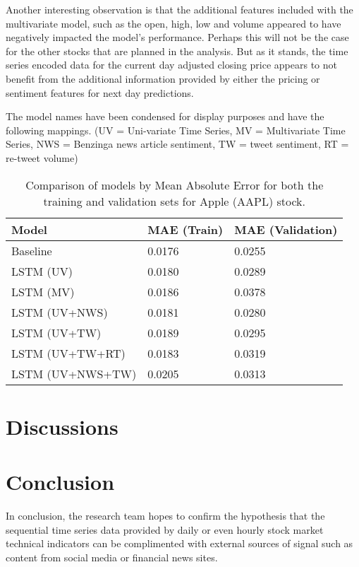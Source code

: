 \documentclass{llncs}
\begin{document}
Another interesting observation is that the additional features included with the multivariate model, such as the open, high, low and volume appeared to have negatively impacted the model's performance.  Perhaps this will not be the case for the other stocks that are planned in the analysis.  But as it stands, the time series encoded data for the current day adjusted closing price appears to not benefit from the additional information provided by either the pricing or sentiment features for next day predictions.

The model names have been condensed for display purposes and have the following mappings.  (UV = Uni-variate Time Series, MV = Multivariate Time Series, NWS = Benzinga news article sentiment, TW = tweet sentiment, RT = re-tweet volume) 

\begin{table}[ht!]
    \centering
    \caption{Comparison of models by Mean Absolute Error for both the training and validation sets for Apple (AAPL) stock.}
    \begin{tabu}{*{3}{X[c]}}
    \toprule
        Model & MAE (Train) & MAE (Validation) \\
    \midrule
    Baseline & 0.0176 & 0.0255 \\
    LSTM (UV) & 0.0180 & 0.0289 \\
    LSTM (MV) & 0.0186 & 0.0378 \\
    LSTM (UV+NWS) & 0.0181 & 0.0280 \\
    LSTM (UV+TW) & 0.0189 & 0.0295 \\
    LSTM (UV+TW+RT) & 0.0183 & 0.0319 \\
    LSTM (UV+NWS+TW) & 0.0205 & 0.0313 \\
 
    \bottomrule
    \end{tabu}
 \label{tab:model_comparisons}
\end{table}


\section{Discussions}

\section{Conclusion}


In conclusion, the research team hopes to confirm the hypothesis that the sequential time series data provided by daily or even hourly stock market technical indicators can be complimented with external sources of signal such as content from social media or financial news sites.
\end{document}
